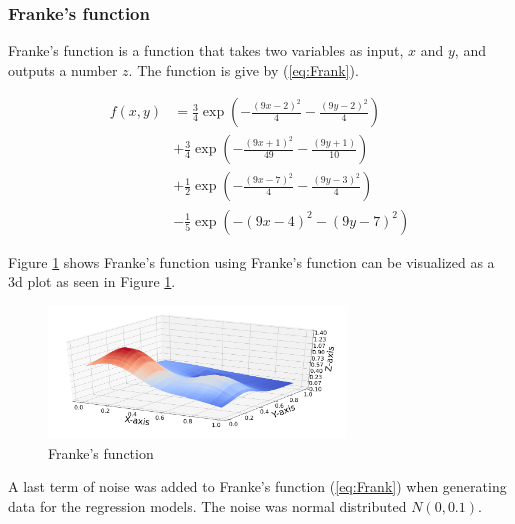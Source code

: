 \documentclass[twocolumn]{cinc}
\begin{document}
\subsubsection{Franke's function}
Franke’s function is a function that takes two variables as input, $x$ and $y$, and outputs a number $z$. The function is give by (\ref{eq:Frank}).

\begin{align*}
\tag{Eq 1}
\label{eq:Frank}
f(x,y) &= \frac{3}{4}\exp{\left(-\frac{(9x-2)^2}{4} - \frac{(9y-2)^2}{4}\right)} \\ &+\frac{3}{4}\exp{\left(-\frac{(9x+1)^2}{49}- \frac{(9y+1)}{10}\right)}\\ 
&+\frac{1}{2}\exp{\left(-\frac{(9x-7)^2}{4} - \frac{(9y-3)^2}{4}\right)}\\ 
&-\frac{1}{5}\exp{\left(-(9x-4)^2 - (9y-7)^2\right) }
\end{align*}

Figure \ref{fig:Frankplt} shows Franke's function using 
Franke's function can be visualized as a 3d plot as seen in Figure \ref{fig:Frankplt}.

\begin{figure}[h]
\includegraphics[width=7.9cm]{Figures/Franke_func.png}
\caption{Franke's function}
\label{fig:Frankplt}
\end{figure}

A last term of noise was added to Franke’s function (\ref{eq:Frank}) when generating data for the regression models. The noise was  normal distributed  $N(0,0.1)$.  
\end{document}
